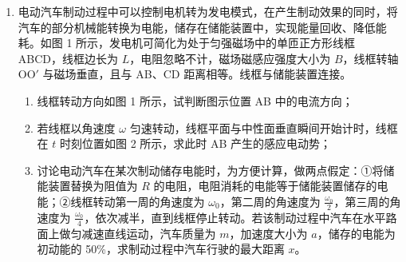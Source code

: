 \documentclass[\gkver]{gaokaozhenti}
\begin{document}
\begin{enumerate}
{则轨迹所对圆心角为 $120^\circ$，则粒子在磁场中运动的时间

$t_{1} = \frac{120^\circ}{360^\circ}T = \frac{2\pi mv}{3qE}$

}

\item
电动汽车制动过程中可以控制电机转为发电模式，在产生制动效果的同时，将汽车的部分机械能转换为电能，储存在储能装置中，实现能量回收、降低能耗。如图 1 所示，发电机可简化为处于匀强磁场中的单匝正方形线框 ABCD，线框边长为 $L$，电阻忽略不计，磁场磁感应强度大小为 $B$，线框转轴 OO$'$ 与磁场垂直，且与 AB、CD 距离相等。线框与储能装置连接。
\begin{enumerate}
	\item
	线框转动方向如图 1 所示，试判断图示位置 AB 中的电流方向；
	\item
	若线框以角速度 $\omega$ 匀速转动，线框平面与中性面垂直瞬间开始计时，线框在 $t$ 时刻位置如图 2 所示，求此时 AB 产生的感应电动势；
	\item
	讨论电动汽车在某次制动储存电能时，为方便计算，做两点假定：①将储能装置替换为阻值为 $R$ 的电阻，电阻消耗的电能等于储能装置储存的电能；②线框转动第一周的角速度为 $\omega_{0}$，第二周的角速度为 $\frac{\omega_{0}}{2}$，第三周的角速度为 $\frac{\omega_{0}}{4}$，依次减半，直到线框停止转动。若该制动过程中汽车在水平路面上做匀减速直线运动，汽车质量为 $m$，加速度大小为 $a$，储存的电能为初动能的 50\%，求制动过程中汽车行驶的最大距离 $x$。
\end{enumerate}
\end{enumerate}
\end{document}
